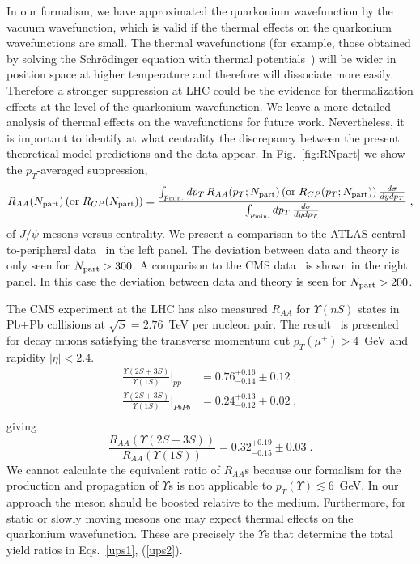 \documentclass[article,showpacs,preprintnumbers,amsmath,amssymb]{revtex4}
\begin{document}
In our formalism, we have approximated the quarkonium wavefunction by the
vacuum wavefunction, which is valid if the thermal effects on the  quarkonium 
wavefunctions are small.  The thermal wavefunctions  (for example, those obtained by
solving the Schr\"{o}dinger equation with thermal
potentials~\cite{Mocsy:2007jz,Rapp:2009my,Strickland:LongAndShort,Margotta:2011ta})
will be wider in position space at higher temperature and therefore will
dissociate more easily. Therefore a stronger suppression at LHC could be
the evidence for thermalization effects at the level of the quarkonium
wavefunction. We leave a more detailed analysis of thermal effects on
the wavefunctions for future work. Nevertheless, it is important to 
identify at what centrality the discrepancy between the present theoretical 
model predictions and the data appear. 
In Fig.~\ref{fig:RNpart} we show the $p_T$-averaged suppression,
\begin{equation} 
R_{AA}(N_{\rm part}) \left( {\rm or} \;  R_{CP}(N_{\rm part}) \right) = 
\frac{  \int_{p_{\rm min.}} d p_T \, R_{AA}(p_T;N_{\rm part}) \left(  {\rm or} \;  
R_{CP}(p_T;N_{\rm part}) \right) \frac{d\sigma}{dydp_T} } {   \int_{p_{\rm min.}} d p_T \, 
\frac{d\sigma}{dydp_T}   }    \; ,
\label{ptav}
\end{equation} 
of $J/\psi$ mesons versus centrality. We present a comparison to the 
ATLAS central-to-peripheral data~\cite{:2010px} in the left panel. The
deviation between data and theory is only seen for $N_{\rm part} > 300$.  A
comparison to the CMS data~\cite{Chatrchyan:2012np} is shown in the right
panel. In this case the deviation between data and theory is seen for $N_{\rm
part} > 200$.  



The CMS  experiment at the LHC has also measured $R_{AA}$ for $\Upsilon(nS)$
states in Pb$+$Pb collisions at $\sqrt{S}=2.76$~TeV per nucleon pair. The
result~\cite{Chatrchyan:2011pe} is presented for decay muons satisfying the
transverse momentum cut  $p_T(\mu^{\pm})>4$~GeV and rapidity $|\eta| < 2.4$.
\begin{equation}
\begin{split}
\frac{\Upsilon(2S+3S)}{\Upsilon(1S)}|_{pp} &=0.76^{+0.16}_{-0.14}\pm0.12 \; ,\\
\frac{\Upsilon(2S+3S)}{\Upsilon(1S)}|_{PbPb} &=0.24^{+0.13}_{-0.12}\pm0.02  \; ,\\
\end{split}
\label{ups1}
\end{equation}
giving
\begin{equation}
\frac{R_{AA}(\Upsilon(2S+3S))}{R_{AA}(\Upsilon(1S))} =
0.32^{+0.19}_{-0.15}\pm0.03\;.
\label{ups2}
\end{equation}
We cannot calculate the equivalent ratio of $R_{AA}$s because our formalism
for the production and propagation of $\Upsilon$s is not applicable to
$p_T(\Upsilon)\lesssim 6$~GeV. In our approach the meson should be boosted
relative to the medium. Furthermore, for static or slowly moving mesons one
may expect thermal effects on the quarkonium wavefunction. These are precisely 
the $\Upsilon$s that determine the total yield ratios in Eqs.~\ref{ups1}, 
(\ref{ups2}).
\end{document}
